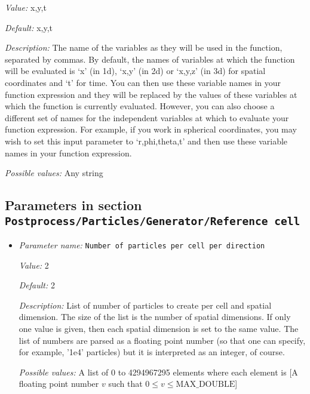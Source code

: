 \begin{itemize}
{\it Value:} x,y,t


{\it Default:} x,y,t


{\it Description:} The name of the variables as they will be used in the function, separated by commas. By default, the names of variables at which the function will be evaluated is `x' (in 1d), `x,y' (in 2d) or `x,y,z' (in 3d) for spatial coordinates and `t' for time. You can then use these variable names in your function expression and they will be replaced by the values of these variables at which the function is currently evaluated. However, you can also choose a different set of names for the independent variables at which to evaluate your function expression. For example, if you work in spherical coordinates, you may wish to set this input parameter to `r,phi,theta,t' and then use these variable names in your function expression.


{\it Possible values:} Any string
\end{itemize}

\subsection{Parameters in section \tt Postprocess/Particles/Generator/Reference cell}
\label{parameters:Postprocess/Particles/Generator/Reference_20cell}

\begin{itemize}
\item {\it Parameter name:} {\tt Number of particles per cell per direction}
\label{parameters:Postprocess/Particles/Generator/Reference cell/Number of particles per cell per direction}


{\it Value:} 2


{\it Default:} 2


{\it Description:} List of number of particles to create per cell and spatial dimension. The size of the list is the number of spatial dimensions. If only one value is given, then each spatial dimension is set to the same value. The list of numbers are parsed as a floating point number (so that one can specify, for example, '1e4' particles) but it is interpreted as an integer, of course.


{\it Possible values:} A list of 0 to 4294967295 elements where each element is [A floating point number $v$ such that $0 \leq v \leq \text{MAX\_DOUBLE}$]
\end{itemize}

